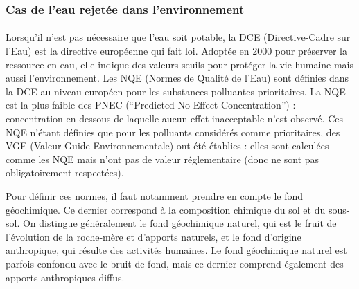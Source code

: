 \documentclass{article}
\begin{document}
\subsubsection{Cas de l’eau rejetée dans l’environnement}
\paragraph{} Lorsqu’il n’est pas nécessaire que l’eau soit potable, la DCE (Directive-Cadre sur l’Eau) est la directive européenne qui fait loi. Adoptée en 2000 pour préserver la ressource en eau, elle indique des valeurs seuils pour protéger la vie humaine mais aussi l’environnement. Les NQE (Normes de Qualité de l’Eau) sont définies dans la DCE au niveau européen pour les substances polluantes prioritaires. La NQE est la plus faible des PNEC (“Predicted No Effect Concentration”) : concentration en dessous de laquelle aucun effet inacceptable n’est observé. Ces NQE n’étant définies que pour les polluants considérés comme prioritaires, des VGE (Valeur Guide Environnementale) ont été établies : elles sont calculées comme les NQE mais n’ont pas de valeur réglementaire (donc ne sont pas obligatoirement respectées).

Pour définir ces normes, il faut notamment prendre en compte le fond géochimique. Ce dernier correspond à la composition chimique du sol et du sous-sol. On distingue généralement le fond géochimique naturel, qui est le fruit de l'évolution de la roche-mère et d'apports naturels, et le fond d'origine anthropique, qui résulte des activités humaines. Le fond géochimique naturel est parfois confondu avec le  bruit de fond, mais ce dernier comprend également des apports anthropiques diffus.
\end{document}
